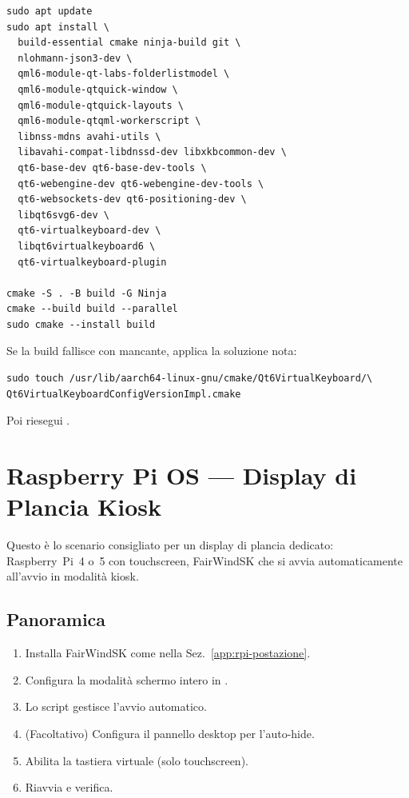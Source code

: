 \begin{lstlisting}
sudo apt update
sudo apt install \
  build-essential cmake ninja-build git \
  nlohmann-json3-dev \
  qml6-module-qt-labs-folderlistmodel \
  qml6-module-qtquick-window \
  qml6-module-qtquick-layouts \
  qml6-module-qtqml-workerscript \
  libnss-mdns avahi-utils \
  libavahi-compat-libdnssd-dev libxkbcommon-dev \
  qt6-base-dev qt6-base-dev-tools \
  qt6-webengine-dev qt6-webengine-dev-tools \
  qt6-websockets-dev qt6-positioning-dev \
  libqt6svg6-dev \
  qt6-virtualkeyboard-dev \
  libqt6virtualkeyboard6 \
  qt6-virtualkeyboard-plugin

cmake -S . -B build -G Ninja
cmake --build build --parallel
sudo cmake --install build
\end{lstlisting}

\begin{notebox}
Se la build fallisce con  mancante,
applica la soluzione nota:
\begin{lstlisting}
sudo touch /usr/lib/aarch64-linux-gnu/cmake/Qt6VirtualKeyboard/\
Qt6VirtualKeyboardConfigVersionImpl.cmake
\end{lstlisting}
Poi riesegui \code{cmake}.
\end{notebox}

\section{Raspberry Pi OS --- Display di Plancia Kiosk}
\label{app:rpi-kiosk}

Questo è lo scenario consigliato per un display di plancia dedicato:
Raspberry~Pi~4 o~5 con touchscreen, FairWindSK che si avvia automaticamente all'avvio
in modalità kiosk.

\subsection{Panoramica}

\begin{enumerate}
  \item Installa FairWindSK come nella Sez.~\ref{app:rpi-postazione}.
  \item Configura la modalità schermo intero in .
  \item Lo script  gestisce l'avvio automatico.
  \item (Facoltativo) Configura il pannello desktop per l'auto-hide.
  \item Abilita la tastiera virtuale (solo touchscreen).
  \item Riavvia e verifica.
\end{enumerate}

